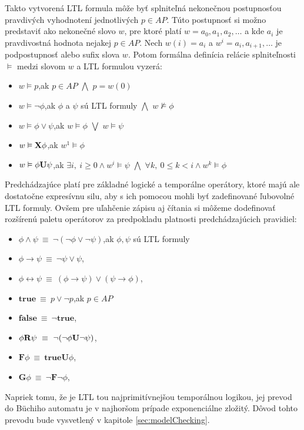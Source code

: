 \documentclass[11pt,final,oneside]{fithesis}
\begin{document}
Takto vytvoren\'a LTL formula m\^ o\v ze by\v t splnite\v ln\'a nekone\v cnou postupnos\v tou pravdiv\'ych vyhodnoten\'i jednotliv\'ych $p \in AP$. 
T\'uto postupnos\v t si mo\v zno predstavi\v t ako nekone\v cn\'e slovo $w$, pre ktor\'e plat\'i $w = a_0,a_1,a_2,\dots{}$ a kde $a_i$ je pravdivostn\'a hodnota
nejakej $p \in AP$. Nech $w(i) = a_i$ a $w^i = a_i,a_{i+1},\dots{}$ je podpostupnos\v t alebo sufix slova $w$. Potom form\'alna defin\'icia rel\'acie splnite\v lnosti
$\vDash$ medzi slovom $w$ a LTL formulou vyzer\'a:
\begin{itemize}
\item $w \vDash p$,\hfil ak $p \in AP$ $\bigwedge$ $p = w(0)$
\item $w \vDash \neg\phi$,\hfil ak $\phi$ a $\psi$ s\'u LTL formuly $\bigwedge$ $w \nvDash \phi$
\item $w \vDash \phi \vee \psi$,\hfil ak $w \vDash \phi$ $\bigvee$ $w \vDash \psi$
\item $w \vDash {\bf X}\phi$,\hfil ak $w^1 \vDash \phi$
\item $w \vDash \phi {\bf U} \psi$,\hfil ak $\exists i,\ i \geq 0 \wedge w^i \vDash \psi$ $\bigwedge$ $\forall k,\ 0 \leq k < i \wedge w^k \vDash \phi$
\end{itemize}
Predch\'adzaj\'uce plat\'i pre z\'akladn\'e logick\'e a tempor\'alne oper\'atory, ktor\'e maj\'u ale dostato\v cne expres\'ivnu silu, aby s ich pomocou
mohli by\v t zadefinovan\'e \v lubovoln\'e LTL formuly. Ov\v sem pre u\v lah\v cenie z\'apisu aj \v c\'itania si m\^ o\v zeme dodefinova\v t roz\v s\'iren\'u
paletu oper\'atorov za predpokladu platnosti predch\'adzaj\'ucich pravidiel:
\begin{itemize}
\item $\phi \wedge \psi \ \equiv \ \neg(\neg \phi \vee \neg \psi)$,\hfil ak $\phi, \psi$ s\'u LTL formuly
\item $\phi \rightarrow \psi \ \equiv \ \neg \psi \vee \psi$,
\item $\phi \leftrightarrow \psi \ \equiv \ (\phi \rightarrow \psi) \vee (\psi \rightarrow \phi)$,
\item $\mathbf{true} \ \equiv \ p \vee \neg p$,\hfil ak $p \in AP$
\item $\mathbf{false} \ \equiv \ \neg\mathbf{true}$,
\item $\phi {\bf R} \psi \ \equiv \ \neg(\neg\phi{\bf U}\neg\psi)$,
\item $\mathbf{F} \phi \ \equiv \ \mathbf{true U} \phi$,
\item $\mathbf{G} \phi \ \equiv \ \neg \mathbf{F} \neg \phi$,
\end{itemize}
Napriek tomu, \v ze je LTL tou najprimit\' ivnej\v sou tempor\'alnou logikou, jej prevod do B\"uchiho automatu je v najhor\v som pr\' ipade 
exponenci\' alne zlo\v zit\' y. D\^ ovod tohto prevodu bude vysvetlen\' y v kapitole \ref{sec:modelChecking}. 
\cite{Clarke:MC:LTL}
\end{document}
